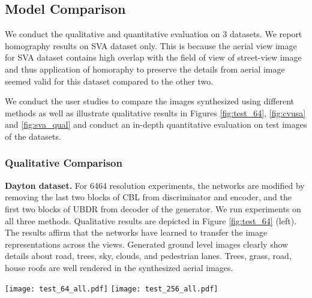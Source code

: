 \documentclass[times,twocolumn,final,authoryear]{elsarticle_modified}
\begin{document}
\vspace{-10pt}

\subsection{Model Comparison} 
We conduct the qualitative and quantitative evaluation on 3 datasets. We report homography results on SVA dataset only.
This is because the aerial view image for SVA dataset contains high overlap with the field of view of street-view image and thus application of homoraphy to preserve the details from aerial image seemed valid for this dataset compared to the other two. 

We conduct the user studies to compare the images synthesized using different methods as well as illustrate qualitative results in Figures \ref{fig:test_64}, \ref{fig:cvusa} and \ref{fig:sva_qual} and conduct an in-depth quantitative evaluation on test images of the datasets.

\vspace{-5pt}

\subsubsection{Qualitative Comparison}



\noindent \textbf{Dayton dataset.} For 6464 resolution experiments, the networks are modified by removing the last two blocks of CBL from discriminator and encoder, and the first two blocks of UBDR from decoder of the generator. We run experiments on all three methods. Qualitative results are depicted in Figure \ref{fig:test_64} (left). The results affirm that the networks have learned to transfer the image representations across the views. Generated ground level images clearly show details about road, trees, sky, clouds, and pedestrian lanes. Trees, grass, road, house roofs are well rendered in the synthesized aerial images.

\begin{figure*}
\centering
\texttt{[image: test\_64\_all.pdf]} \hspace*{5pt}
\texttt{[image: test\_256\_all.pdf]}
\vspace{-18pt}
\caption{\small \label{fig:test_64}Example images generated by different methods in low (64  64) resolution (left) 
and high (256  256) resolution (right) in  \textbf{a2g} and \textbf{g2a} directions on the \textbf{Dayton} dataset.}
  \vspace{-10pt}
\end{figure*}
\end{document}
